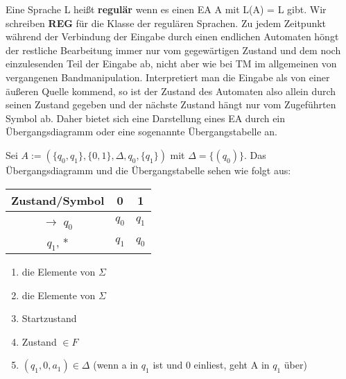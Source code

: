     Eine Sprache L heißt \textbf{regulär} wenn es einen EA A mit L(A) = L gibt. Wir schreiben \textbf{REG} für die Klasse der regulären Sprachen. Zu jedem Zeitpunkt während der Verbindung der Eingabe durch einen endlichen Automaten höngt der restliche Bearbeitung immer nur vom gegewärtigen Zustand und dem noch einzulesenden Teil der Eingabe ab, nicht aber wie bei TM im allgemeinen von vergangenen Bandmanipulation. Interpretiert man die Eingabe als von einer äußeren Quelle kommend, so ist der  Zustand des Automaten also allein durch seinen Zustand gegeben und der nächste Zustand hängt nur vom Zugeführten Symbol ab. Daher bietet sich eine Darstellung eines EA durch ein Übergangsdiagramm oder eine sogenannte Übergangstabelle an.

\newpage

    Sei \(A := (\{q_{0}, q_{1}\}, \{0, 1\}, \Delta, q_{0}, \{q_{1}\})\) mit \(\Delta = \{(q_{0})\}\). Das Übergangsdiagramm und die Übergangstabelle sehen wie folgt aus:

    \begin{center}
        \begin{tabular}{|c|c|c|}
            \hline
            \textbf{Zustand/Symbol} & \textbf{0} \footnotemark[1] & \textbf{1} \footnotemark[2] \\
            \hline
            \( \rightarrow\) \footnotemark[3] \(q_{0}\) & \(q_{0}\) & \(q_{1}\) \\
            \hline
            \(q_{1}\), * \footnotemark[4] & \(q_{1}\) \footnotemark[5] & \(q_{0}\) \\
            \hline
        \end{tabular}
    \end{center}
    \begin{enumerate}
        \item  die Elemente von \(\Sigma\)
        \item  die Elemente von \(\Sigma\)
        \item  Startzustand
        \item  Zustand \(\in F\)
        \item  \((q_1, 0, a_1) \in \Delta\) (wenn a in \(q_1\) ist und 0 einliest, geht A in \(q_1\) über)
    \end{enumerate}
    {

    }

